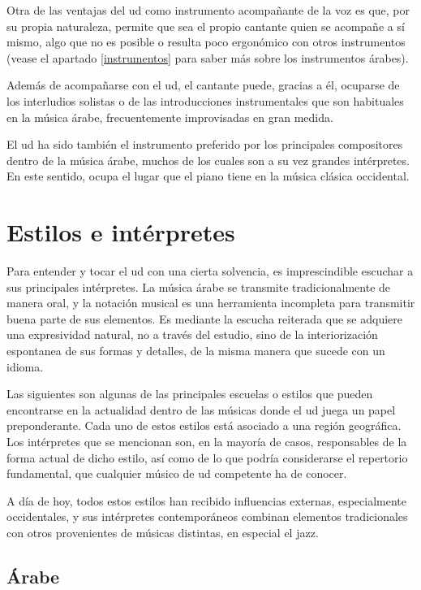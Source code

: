 Otra de las ventajas del ud como instrumento acompañante de la voz es que, por su propia naturaleza, permite que sea el propio cantante quien se acompañe a sí mismo, algo que no es posible o resulta poco ergonómico con otros instrumentos (vease el apartado \ref{instrumentos} para saber más sobre los instrumentos árabes).

Además de acompañarse con el ud, el cantante puede, gracias a él, ocuparse de los interludios solistas o de las introducciones instrumentales que son habituales en la música árabe, frecuentemente improvisadas en gran medida. 

El ud ha sido también el instrumento preferido por los principales compositores dentro de la música árabe, muchos de los cuales son a su vez grandes intérpretes. En este sentido, ocupa el lugar que el piano tiene en la música clásica occidental.

\label{estilos}
\section{Estilos e intérpretes}

Para entender y tocar el ud con una cierta solvencia, es imprescindible escuchar a sus principales intérpretes. La música árabe se transmite tradicionalmente de manera oral, y la notación musical es una herramienta incompleta para transmitir buena parte de sus elementos. Es mediante la escucha reiterada que se adquiere una expresividad natural, no a través del estudio, sino de la interiorización espontanea de sus formas y detalles, de la misma manera que sucede con un idioma.

Las siguientes son algunas de las principales escuelas o estilos que pueden encontrarse en la actualidad dentro de las músicas donde el ud juega un papel preponderante. Cada uno de estos estilos está asociado a una región geográfica. Los intérpretes que se mencionan son, en la mayoría de casos, responsables de la forma actual de dicho estilo, así como de lo que podría considerarse el repertorio fundamental, que cualquier músico de ud competente ha de conocer.

A día de hoy, todos estos estilos han recibido influencias externas, especialmente occidentales, y sus intérpretes contemporáneos combinan elementos tradicionales con otros provenientes de músicas distintas, en especial el jazz.


\subsection{Árabe}

